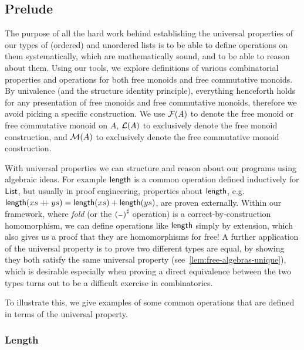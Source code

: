 
\subsection{Prelude}
\label{sec:prelude}

The purpose of all the hard work behind establishing the universal properties of our types of (ordered) and unordered
lists is to be able to define operations on them systematically, which are mathematically sound, and to be able to
reason about them.
%
Using our tools, we explore definitions of various combinatorial properties and operations for both
free monoids and free commutative monoids.
%
%
By univalence (and the structure identity principle), everything henceforth holds for any presentation of free monoids
and free commutative monoids, therefore we avoid picking a specific construction.
%
We use $\mathcal{F}(A)$ to denote the free monoid or free commutative monoid on $A$, $\mathcal{L}(A)$ to exclusively denote the free
monoid construction, and $\mathcal{M}(A)$ to exclusively denote the free commutative monoid construction.

With universal properties we can structure and reason about our programs using algebraic ideas.
%
For example $\operatorname{\mathsf{length}}$ is a common operation defined inductively for $\operatorname{\mathsf{List}}$,
but usually in proof engineering, properties about $\operatorname{\mathsf{length}}$, e.g.
$\operatorname{\mathsf{length}}(xs \mathbin{+\kern -0.4em+} ys) = \operatorname{\mathsf{length}}(xs) + \operatorname{\mathsf{length}}(ys)$,
are proven externally.
%
Within our framework, where \emph{fold} (or the ${({\scriptstyle{-}})}^{\sharp}$ operation) is a correct-by-construction homomorphism,
we can define operations like $\operatorname{\mathsf{length}}$ simply by extension,
which also gives us a proof that they are homomorphisms for free!
%
A further application of the universal property is to prove two different types are equal, by showing they both satisfy
the same universal property (see~\cref{lem:free-algebras-unique}), which is desirable especially when proving a direct
equivalence between the two types turns out to be a difficult exercise in combinatorics.

To illustrate this, we give examples of some common operations that are defined in terms of the universal property.

\subsubsection{Length}

